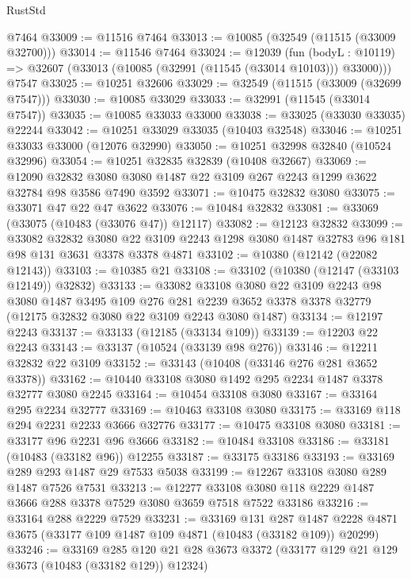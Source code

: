 \begin{lexlean}{RustStd}
\begin{coremodule}
    @7464
@33009 := @11516 @7464
@33013 := @10085 (@32549 (@11515 (@33009 @32700)))
@33014 := @11546 @7464
@33024 := @12039
    (fun (bodyL : @10119) => @32607 (@33013 (@10085 (@32991 (@11545 (@33014 @10103))) @33000)))
    @7547
@33025 := @10251 @32606
@33029 := @32549 (@11515 (@33009 (@32699 @7547)))
@33030 := @10085 @33029
@33033 := @32991 (@11545 (@33014 @7547))
@33035 := @10085 @33033 @33000
@33038 := @33025 (@33030 @33035) @22244
@33042 := @10251 @33029 @33035 (@10403 @32548)
@33046 := @10251 @33033 @33000 (@12076 @32990)
@33050 := @10251 @32998 @32840 (@10524 @32996)
@33054 := @10251 @32835 @32839 (@10408 @32667)
@33069 := @12090
    @32832
    @3080
    @3080
    @1487
    @22
    @3109
    @267
    @2243
    @1299
    @3622
    @32784
    @98
    @3586
    @7490
    @3592
@33071 := @10475 @32832 @3080
@33075 := @33071 @47 @22 @47 @3622
@33076 := @10484 @32832
@33081 := @33069 (@33075 (@10483 (@33076 @47)) @12117)
@33082 := @12123 @32832
@33099 := @33082
    @32832
    @3080
    @22
    @3109
    @2243
    @1298
    @3080
    @1487
    @32783
    @96
    @181
    @98
    @131
    @3631
    @3378
    @3378
    @4871
@33102 := @10380 (@12142 (@22082 @12143))
@33103 := @10385 @21
@33108 := @33102 (@10380 (@12147 (@33103 @12149)) @32832)
@33133 := @33082
    @33108
    @3080
    @22
    @3109
    @2243
    @98
    @3080
    @1487
    @3495
    @109
    @276
    @281
    @2239
    @3652
    @3378
    @3378
    @32779
    (@12175 @32832 @3080 @22 @3109 @2243 @3080 @1487)
@33134 := @12197 @2243
@33137 := @33133 (@12185 (@33134 @109))
@33139 := @12203 @22 @2243
@33143 := @33137 (@10524 (@33139 @98 @276))
@33146 := @12211 @32832 @22 @3109
@33152 := @33143 (@10408 (@33146 @276 @281 @3652 @3378))
@33162 := @10440 @33108 @3080 @1492 @295 @2234 @1487 @3378 @32777 @3080 @2245
@33164 := @10454 @33108 @3080
@33167 := @33164 @295 @2234 @32777
@33169 := @10463 @33108 @3080
@33175 := @33169 @118 @294 @2231 @2233 @3666 @32776
@33177 := @10475 @33108 @3080
@33181 := @33177 @96 @2231 @96 @3666
@33182 := @10484 @33108
@33186 := @33181 (@10483 (@33182 @96)) @12255
@33187 := @33175 @33186
@33193 := @33169 @289 @293 @1487 @29 @7533 @5038
@33199 := @12267 @33108 @3080 @289 @1487 @7526 @7531
@33213 := @12277 @33108 @3080 @118 @2229 @1487 @3666 @288 @3378 @7529 @3080 @3659 @7518 @7522 @33186
@33216 := @33164 @288 @2229 @7529
@33231 := @33169
    @131
    @287
    @1487
    @2228
    @4871
    @3675
    (@33177 @109 @1487 @109 @4871 (@10483 (@33182 @109)) @20299)
@33246 := @33169
    @285
    @120
    @21
    @28
    @3673
    @3372
    (@33177 @129 @21 @129 @3673 (@10483 (@33182 @129)) @12324)

\end{coremodule}
\end{lexlean}
